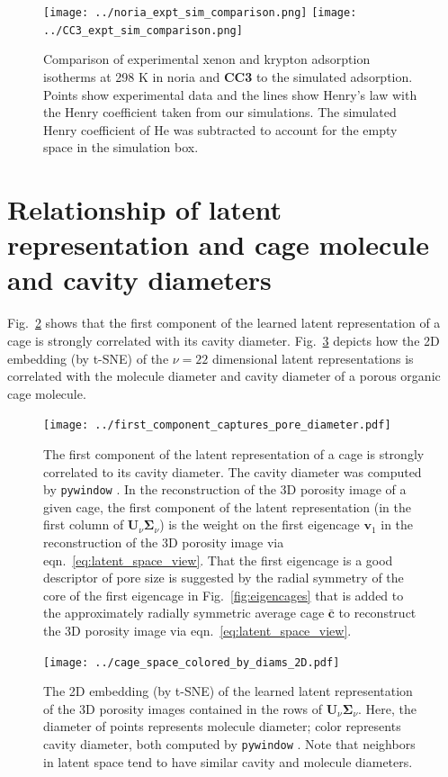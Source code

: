 \documentclass[journal=jacsat,manuscript=article]{achemso}
\begin{document}
\begin{figure}
\centering
	\texttt{[image: ../noria\_expt\_sim\_comparison.png]}
	\texttt{[image: ../CC3\_expt\_sim\_comparison.png]}
	\caption{Comparison of experimental xenon and krypton adsorption isotherms at 298 K in noria \cite{patil2016noria} and \textbf{CC3} \cite{chen2014separation} to the simulated adsorption. Points show experimental data and the lines show Henry's law with the Henry coefficient taken from our simulations. The simulated Henry coefficient of He was subtracted to account for the empty space in the simulation box.
	} \label{fig:expt_sim_compare}
\end{figure}

\newpage
\clearpage

\section{Relationship of latent representation and cage molecule and cavity diameters}
Fig.~\ref{fig:first_component_captures_pore_diameter} shows that the first component of the learned latent representation of a cage is strongly correlated with its cavity diameter. 
Fig.~\ref{fig:cage_space_colored_by_diams_2D} depicts how the 2D embedding (by t-SNE) of the $\nu=22$ dimensional latent representations is correlated with the molecule diameter and cavity diameter of a porous organic cage molecule.

\begin{figure}
\centering
	\texttt{[image: ../first\_component\_captures\_pore\_diameter.pdf]}
	\caption{The first component of the latent representation of a cage is strongly correlated to its cavity diameter. The cavity diameter was computed by \texttt{pywindow} \cite{miklitz2018pywindow}. In the reconstruction of the 3D porosity image of a given cage, the first component of the latent representation (in the first column of $\mathbf{U}_\nu \mathbf{\Sigma}_\nu$) is the weight on the first eigencage $\mathbf{v}_1$ in the reconstruction of the 3D porosity image via eqn.~\ref{eq:latent_space_view}. That the first eigencage is a good descriptor of pore size is suggested by the radial symmetry of the core of the first eigencage in Fig.~\ref{fig:eigencages} that is added to the approximately radially symmetric average cage $\bar{\mathbf{c}}$ to reconstruct the 3D porosity image via eqn.~\ref{eq:latent_space_view}.
	} \label{fig:first_component_captures_pore_diameter}
\end{figure}


\begin{figure}
\centering
	\texttt{[image: ../cage\_space\_colored\_by\_diams\_2D.pdf]}
	\caption{The 2D embedding (by t-SNE) of the learned latent representation of the 3D porosity images contained in the rows of $\mathbf{U}_\nu \mathbf{\Sigma}_\nu$. Here, the diameter of points represents molecule diameter; color represents cavity diameter, both computed by \texttt{pywindow} \cite{miklitz2018pywindow}. Note that neighbors in latent space tend to have similar cavity and molecule diameters.
	} \label{fig:cage_space_colored_by_diams_2D}
\end{figure}
\end{document}
